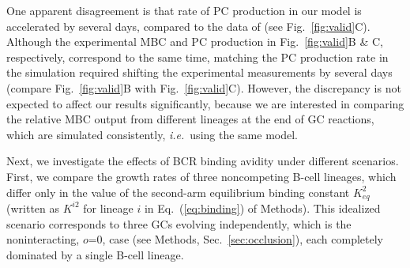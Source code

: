 \documentclass[utf8]{frontiersHLTH}%
\newcommand{\vo}[1]{#1} %
\def\ie {{\it i.e.}}
\newcommand{\eq}[1] {Eq.~(\ref{eq:#1})}
\newcommand{\fig}[1]{Fig.~\ref{fig:#1}}
\newcommand{\Sec}[1]{Sec.~\ref{sec:#1}}
\renewcommand{\sec}[1]{\Sec{#1}}
\newcommand{\occl}{o}
\begin{document}
One apparent disagreement is that rate of PC production in our model is
accelerated by several days, compared to the data of \citet{weisel16}
(see \fig{valid}C).
\vo{Although the experimental MBC and PC production in \fig{valid}B \& C, respectively, correspond
to the same time, matching the PC production rate in the simulation required shifting the experimental
measurements by several days (compare \fig{valid}B with \fig{valid}C).}
However, the discrepancy is not expected to affect our results
significantly, because we are interested in comparing the relative MBC
output from different lineages at the end of GC reactions, which are
simulated consistently, \ie~using the same model.

Next, we investigate the
effects of BCR binding avidity under different \vo{scenarios}. First, we compare the
growth rates of three noncompeting B-cell lineages, which differ only in
the value of the second-arm equilibrium binding constant $K^2_{eq}$ (written as $K^{i2}$ for lineage $i$ in \eq{binding} of Methods). This idealized
scenario corresponds to three GCs evolving independently, which is
the noninteracting, \vo{$\occl$=0, case (see Methods, \sec{occlusion}}), each completely dominated by a
single B-cell lineage. 
\end{document}
